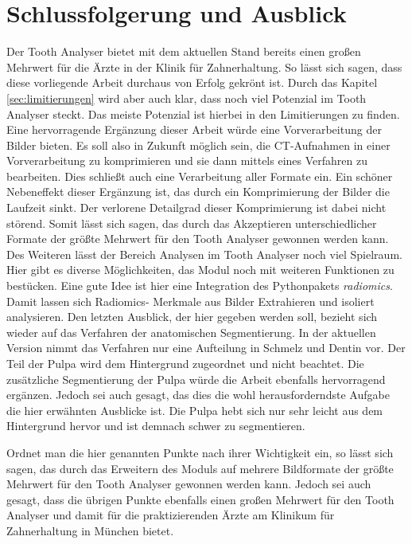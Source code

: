 \chapter{Schlussfolgerung und Ausblick}
\label{chap:schlussfolgerung} Der Tooth Analyser bietet mit dem aktuellen Stand bereits
einen großen Mehrwert für die Ärzte in der Klinik für Zahnerhaltung. So lässt
sich sagen, dass diese vorliegende Arbeit durchaus von Erfolg gekrönt ist. Durch
das Kapitel \ref{sec:limitierungen} wird aber auch klar, dass noch viel Potenzial
im Tooth Analyser steckt. Das meiste Potenzial ist hierbei in den Limitierungen
zu finden. Eine hervorragende Ergänzung dieser Arbeit würde eine Vorverarbeitung
der Bilder bieten. Es soll also in Zukunft möglich sein, die CT-Aufnahmen in einer
Vorverarbeitung zu komprimieren und sie dann mittels eines Verfahren zu bearbeiten.
Dies schließt auch eine Verarbeitung aller Formate ein. Ein schöner Nebeneffekt dieser
Ergänzung ist, das durch ein Komprimierung der Bilder die Laufzeit sinkt. Der verlorene
Detailgrad dieser Komprimierung ist dabei nicht störend. Somit lässt sich sagen,
das durch das Akzeptieren unterschiedlicher Formate der größte Mehrwert für den Tooth
Analyser gewonnen werden kann. Des Weiteren lässt der Bereich Analysen im Tooth
Analyser noch viel Spielraum. Hier gibt es diverse Möglichkeiten, das Modul noch
mit weiteren Funktionen zu bestücken. Eine gute Idee ist hier eine Integration des
Pythonpakets \textit{radiomics}. Damit lassen sich Radiomics- Merkmale aus
Bilder Extrahieren und isoliert analysieren. Den letzten Ausblick, der hier
gegeben werden soll, bezieht sich wieder auf das Verfahren der anatomischen Segmentierung.
In der aktuellen Version nimmt das Verfahren nur eine Aufteilung in Schmelz und
Dentin vor. Der Teil der Pulpa wird dem Hintergrund zugeordnet und nicht beachtet.
Die zusätzliche Segmentierung der Pulpa würde die Arbeit ebenfalls hervorragend
ergänzen. Jedoch sei auch gesagt, das dies die wohl herausforderndste Aufgabe
die hier erwähnten Ausblicke ist. Die Pulpa hebt sich nur sehr leicht aus dem Hintergrund
hervor und ist demnach schwer zu segmentieren.

Ordnet man die hier genannten Punkte nach ihrer Wichtigkeit ein, so lässt sich
sagen, das durch das Erweitern des Moduls auf mehrere Bildformate der größte Mehrwert
für den Tooth Analyser gewonnen werden kann. Jedoch sei auch gesagt, dass die übrigen
Punkte ebenfalls einen großen Mehrwert für den Tooth Analyser und damit für die praktizierenden
Ärzte am Klinikum für Zahnerhaltung in München bietet.
